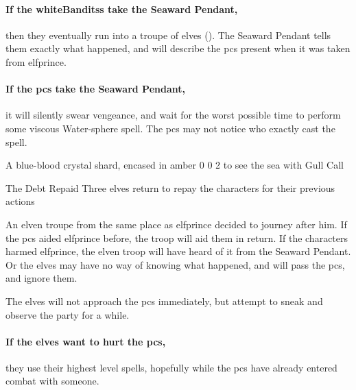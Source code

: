\paragraph{If the \glspl{whiteBandits} take the Seaward Pendant,}
then they eventually run into a troupe of elves ().
The Seaward Pendant tells them exactly what happened, and will describe the \glspl{pc} present when it was taken from \gls{elfprince}.

\paragraph{If the \glspl{pc} take the Seaward Pendant,}
it will silently swear vengeance, and wait for the worst possible time to perform some viscous Water-\gls{sphere} \gls{spell}.
The \glspl{pc} may not notice who exactly cast the spell.

  {A blue-blood crystal shard, encased in amber}%
  {0}%
  {0}%
  {2}%
  {to see the sea with }%
  {Gull Call}%
  {
    \setcounter{Water}{3}
    \setcounter{Vigilance}{2}
    \setcounter{Performance}{1}
    \setcounter{Survival}{1}
  }%

\showStdSpells

\elfprince

\showStdSpells

{The Debt Repaid}%
{Three elves return to repay the characters for their previous actions}%
\label{karmaElves}

An elven troupe from the same place as \gls{elfprince} decided to journey after him.
If the \glspl{pc} aided \gls{elfprince} before, the troop will aid them in return.
If the characters harmed \gls{elfprince}, the elven troop will have heard of it from the Seaward Pendant.
Or the elves may have no way of knowing what happened, and will pass the \glspl{pc}, and ignore them.

The elves will not approach the \glspl{pc} immediately, but attempt to sneak and observe the party for a while.

\paragraph{If the elves want to hurt the \glspl{pc},}
they use their highest level spells, hopefully while the \glspl{pc} have already entered combat with someone.

